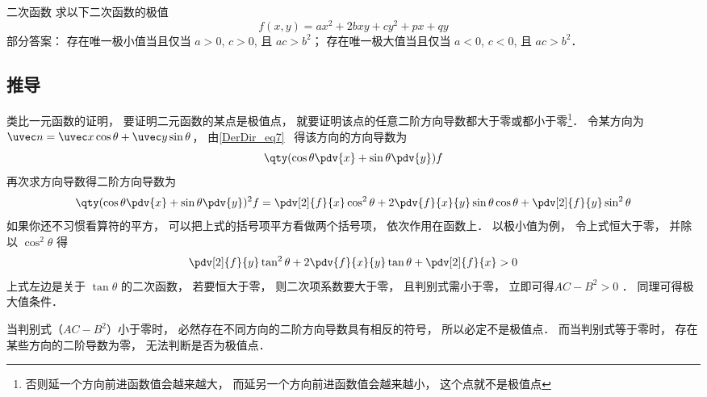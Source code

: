 \begin{exercise}{二次函数}
求以下二次函数的极值
\begin{equation}
f(x, y) = ax^2 + 2bxy + cy^2 + px + qy
\end{equation}
部分答案： 存在唯一极小值当且仅当 $a>0$, $c>0$, 且 $ac>b^2$； 存在唯一极大值当且仅当 $a<0$, $c<0$, 且 $ac>b^2$．
\end{exercise}

\subsection{推导}

类比一元函数的证明， 要证明二元函数的某点是极值点， 就要证明该点的任意二阶方向导数都大于零或都小于零\footnote{否则延一个方向前进函数值会越来越大， 而延另一个方向前进函数值会越来越小， 这个点就不是极值点}． 令某方向为 $\uvec n = \uvec x \cos\theta + \uvec y \sin\theta$， 由\autoref{DerDir_eq7}~ 得该方向的方向导数为
\begin{equation}
\qty(\cos\theta\pdv{x} + \sin\theta\pdv{y}) f
\end{equation}
再次求方向导数得二阶方向导数为
\begin{equation}
\qty(\cos\theta\pdv{x} + \sin\theta\pdv{y})^2 f
= \pdv[2]{f}{x} \cos^2\theta + 2\pdv{f}{x}{y} \sin\theta\cos\theta + \pdv[2]{f}{y} \sin^2\theta
\end{equation}
如果你还不习惯看算符的平方， 可以把上式的括号项平方看做两个括号项， 依次作用在函数上． 以极小值为例， 令上式恒大于零， 并除以 $\cos^2\theta$ 得
\begin{equation}
\pdv[2]{f}{y} \tan^2\theta + 2\pdv{f}{x}{y} \tan\theta + \pdv[2]{f}{x} > 0
\end{equation}
上式左边是关于 $\tan\theta$ 的二次函数， 若要恒大于零， 则二次项系数要大于零， 且判别式需小于零， 立即可得$AC-B^2>0$ ． 同理可得极大值条件．

当判别式（$AC-B^2$）小于零时， 必然存在不同方向的二阶方向导数具有相反的符号， 所以必定不是极值点． 而当判别式等于零时， 存在某些方向的二阶导数为零， 无法判断是否为极值点．

